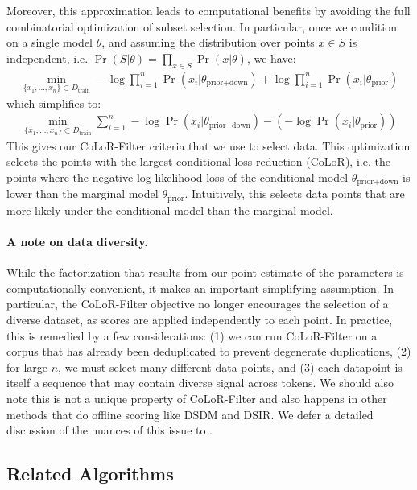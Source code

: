 \documentclass{article}
\newcommand{\Dtrain}{D_{\text{train}}}
\newcommand{\thetaprior}{\theta_{\text{prior}}}
\newcommand{\thetapriordown}{\theta_{\text{prior}+ \text{down}}}
\begin{document}
Moreover, this approximation leads to computational benefits by avoiding the full combinatorial optimization of subset selection. In particular, once we condition on a single model $ \theta$, and assuming the distribution over points $ x \in S$ is independent, i.e. $ \Pr(S|\theta) = \prod_{x \in S} \Pr(x|\theta)$, we have:
\begin{align}
    \min_{\{x_1,\dots, x_{n}\} \subset \Dtrain}   -\log \prod_{i=1}^n \Pr(x_i| \thetapriordown) + \log \prod_{i=1}^n \Pr(x_i | \thetaprior)
\end{align}
which simplifies to:
\begin{align}
     \min_{\{x_1,\dots, x_{n}\} \subset \Dtrain}  \sum_{i=1}^n -\log \Pr(x_i| \thetapriordown) -  (-\log \Pr(x_i | \thetaprior))
\end{align}
This gives our CoLoR-Filter criteria that we use to select data. This optimization selects the points with the largest conditional loss reduction (CoLoR), i.e. the points where the negative log-likelihood loss of the conditional model $ \thetapriordown$ is lower than the marginal model $ \thetaprior$.
Intuitively, this selects data points that are more likely under the conditional model than the marginal model.


\paragraph{A note on data diversity.}
While the factorization that results from our point estimate of the parameters is computationally convenient, it makes an important simplifying assumption. In particular, the CoLoR-Filter objective no longer encourages the selection of a diverse dataset, as scores are applied independently to each point. In practice, this is remedied by a few considerations: (1) we can run CoLoR-Filter on a corpus that has already been deduplicated to prevent degenerate duplications, (2) for large $ n$, we must select many different data points, and (3) each datapoint is itself a sequence that may contain diverse signal across tokens. We should also note this is not a unique property of CoLoR-Filter and also happens in other methods that do offline scoring like DSDM and DSIR.
We defer a detailed discussion of the nuances of this issue to .

\subsection{Related Algorithms}\label{sec:related_algs}
\end{document}
